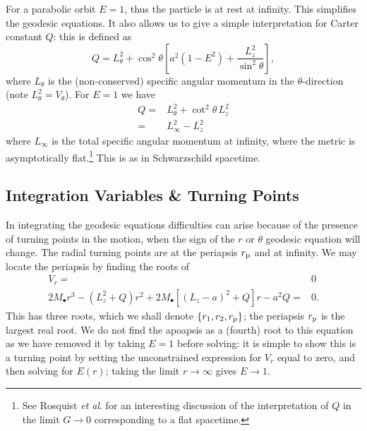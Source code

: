 For a parabolic orbit $E = 1$, thus the particle is at rest at infinity. This simplifies the geodesic equations. It also allows us to give a simple interpretation for Carter constant $Q$: this is defined as
\begin{equation}
Q = L_\theta^2 + \cos^2\theta\left[a^2\left(1 - E^2\right) + \frac{L_z^2}{\sin^2\theta}\right],
\end{equation}
where $L_\theta$ is the (non-conserved) specific angular momentum in the $\theta$-direction (note $L_\theta^2 = V_\theta$). For $E = 1$ we have
\begin{align}
Q = {} & L_\theta^2 + \cot^2\theta\, L_z^2 \nonumber \\
 = {} & L_\infty^2 - L_z^2
\end{align}
where $L_\infty$ is the total specific angular momentum at infinity, where the metric is asymptotically flat\cite{DeFelice1980}.\footnote{See Rosquist {\it et al}.\cite{Rosquist2009} for an interesting discussion of the interpretation of $Q$ in the limit $G \rightarrow 0$ corresponding to a flat spacetime.} This is as in Schwarzschild spacetime.

\subsection{Integration Variables \& Turning Points}

In integrating the geodesic equations difficulties can arise because of the presence of turning points in the motion, when the sign of the $r$ or $\theta$ geodesic equation will change. The radial turning points are at the periapsis $r_\mathrm{p}$ and at infinity. We may locate the periapsis by finding the roots of
\begin{align}
V_r = {} & 0 \nonumber \\
2M_\bullet r^3 - \left(L_z^2+Q\right)r^2 + 2M_\bullet\left[\left(L_z - a\right)^2 + Q\right]r - a^2Q = {} & 0.
\end{align}
This has three roots, which we shall denote $\{r_1, r_2, r_\mathrm{p}\}$; the periapsis $r_\mathrm{p}$ is the largest real root. We do not find the apoapsis as a (fourth) root to this equation as we have removed it by taking $E = 1$ before solving: it is simple to show this is a turning point by setting the unconstrained expression for $V_r$ equal to zero, and then solving for $E(r)$; taking the limit $r \rightarrow \infty$ gives $E \rightarrow 1$\cite{Wilkins1972}.

